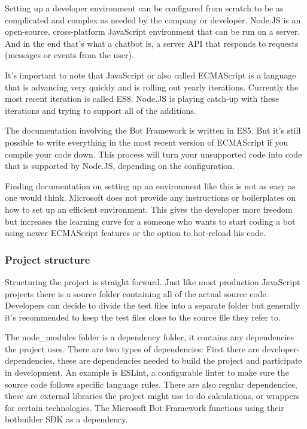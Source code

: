Setting up a developer environment can be configured from scratch to be as complicated and complex as needed by the company or developer. Node.JS is an open-source, cross-platform JavaScript environment that can be run on a server. And in the end that's what a chatbot is, a server API that responds to requests (messages or events from the user).

It's important to note that JavaScript or also called \Gls{ECMAScript} is a language that is advancing very quickly and is rolling out yearly iterations. Currently the most recent iteration is called ES8. Node.JS is playing catch-up with these iterations and trying to support all of the additions.

The documentation involving the Bot Framework is written in \Gls{ES5}. But it's still possible to write everything in the most recent version of ECMAScript if you compile your code down. This process will turn your unsupported code into code that is supported by Node.JS, depending on the configuration.

Finding documentation on setting up an environment like this is not as easy as one would think. Microsoft does not provide any instructions or boilerplates on how to set up an efficient environment. This gives the developer more freedom but increases the learning curve for a someone who wants to start coding a bot using newer ECMAScript features or the option to hot-reload his code.

\subsubsection{Project structure}

Structuring the project is straight forward. Just like most production JavaScript projects there is a source folder containing all of the actual source code. Developers can decide to divide the test files into a separate folder but generally it's recommended to keep the test files close to the source file they refer to.

The node\_modules folder is a dependency folder, it contains any dependencies the project uses. There are two types of dependencies: First there are developer-dependencies, these are dependencies needed to build the project and participate in development. An example is ESLint\cite{eslint}, a configurable linter to make sure the source code follows specific language rules. There are also regular dependencies, these are external libraries the project might use to do calculations, or wrappers for certain technologies. The Microsoft Bot Framework functions using their botbuilder \Gls{SDK} as a dependency.

